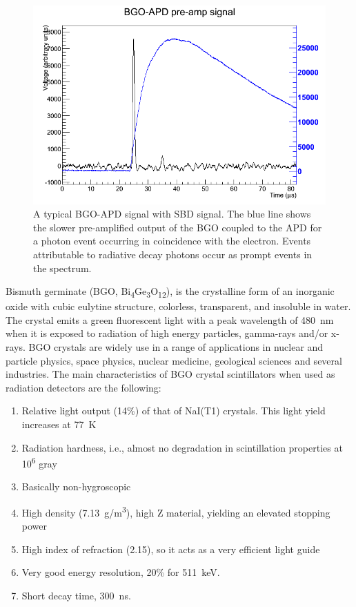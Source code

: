 \documentclass[oneside,12pt]{memoir}
\begin{document}
\begin{figure}[t]
	\includegraphics[width=\textwidth]{BGO_waveform.png}
	\caption[A typical BGO-APD signal with SBD signal.]{A typical BGO-APD signal with SBD signal. The blue line shows the slower pre-amplified output of the BGO coupled to the APD for a photon event occurring in coincidence with the electron. Events attributable to radiative decay photons occur as prompt events in the spectrum.}
	\label{fig:bgo_signal_ch3}
\end{figure}
Bismuth germinate (BGO, Bi\textsubscript{4}Ge\textsubscript{3}O\textsubscript{12}), is the crystalline form of an inorganic oxide with cubic eulytine structure, colorless, transparent, and insoluble in water. The crystal emits a green fluorescent light with a peak wavelength of 480~nm when it is exposed to radiation of high energy particles, gamma-rays and/or x-rays. BGO crystals are widely use in a range of applications in nuclear and particle physics, space physics, nuclear medicine, geological sciences and several industries. The main characteristics of BGO crystal scintillators when used as radiation detectors are the following:
\begin{enumerate}
	\item Relative light output (14\%) of that of NaI(T1) crystals. This light yield increases at 77~K
	\item Radiation hardness, i.e., almost no degradation in scintillation properties at 10\textsuperscript{6} gray
	\item Basically non-hygroscopic
	\item High density (7.13~g/m\textsuperscript{3}), high Z material, yielding an elevated stopping power
	\item High index of refraction (2.15), so it acts as a very efficient light guide
	\item Very good energy resolution, 20\% for 511~keV.
	\item Short decay time, 300~ns.
\end{enumerate}
\end{document}
